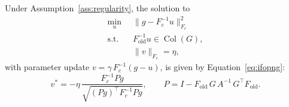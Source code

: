 \begin{theorem}
\label{thm:ifopng}
Under Assumption~\ref{ass:regularity}, the solution to
\begin{equation}
\label{eq:ifopng_problem}
\begin{aligned}
    \min_{u}\;\; & \bigl\| g - F_c^{-1} u \bigr\|_{F_c}^2 \\
    \mathrm{s.t.}\;\; & F_{\mathrm{old}}^{-1} u \in \operatorname{Col}(G), \\
                       & \|v\|_{F_c} = \eta,
\end{aligned}
\end{equation}
with parameter update $v = \gamma\, F_c^{-1}(g - u)$, is given by
Equation~\eqref{eq:ifopng}:
\begin{equation}
    v^* = -\eta\,
    \frac{F_c^{-1} P g}{\sqrt{(Pg)^\top F_c^{-1} P g}},
    \qquad
    P = I - F_{\mathrm{old}}\, G\, A^{-1}\, G^\top F_{\mathrm{old}}.
\end{equation}
\end{theorem}

